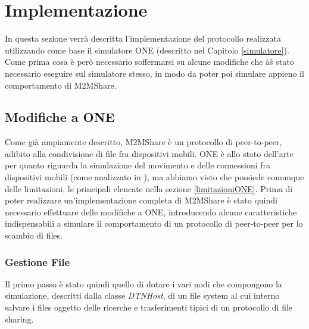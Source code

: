
\chapter{Implementazione}\label{implementazione} %



\graphicspath{{5-implementazione/img/}}


In questa sezione verrà  descritta l'implementazione del protocollo realizzata utilizzando come base il simulatore ONE (descritto nel Capitolo \ref{simulatore}). Come prima cosa è però necessario soffermarsi su alcune modifiche che àš stato necessario eseguire sul simulatore stesso, in modo da poter poi simulare appieno il comportamento di M2MShare.

\section{Modifiche a ONE}
Come già  ampiamente descritto, M2MShare è un protocollo di peer-to-peer, adibito alla condivisione di file fra dispositivi mobili. ONE è allo stato dell'arte per quanto riguarda la simulazione del movimento e delle connessioni fra dispositivi mobili (come analizzato in \cite{panelStateDTNEvaluation}), ma abbiamo visto che possiede comunque delle limitazioni, le principali elencate nella sezione \ref{limitazioniONE}. Prima di poter realizzare un'implementazione completa di M2MShare è stato quindi necessario effettuare delle modifiche a ONE, introducendo alcune caratteristiche indispensabili a simulare il comportamento di un protocollo di peer-to-peer per lo scambio di files.

\subsection{Gestione File}
Il primo passo è stato quindi quello di dotare i vari nodi che compongono la simulazione, descritti dalla classe \textit{DTNHost}, di un file system al cui interno salvare i files oggetto delle ricerche e trasferimenti tipici di un protocollo di file sharing.

